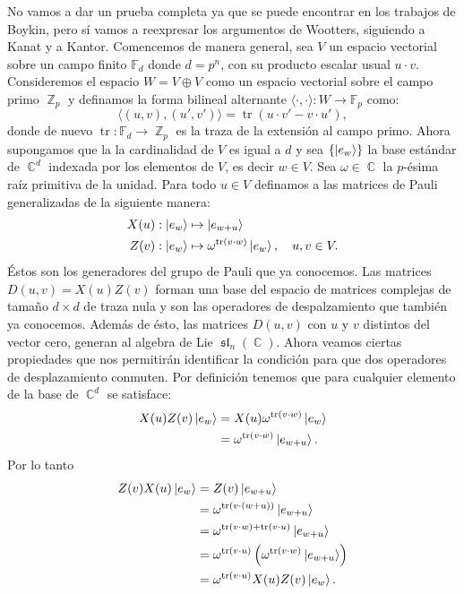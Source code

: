 \documentclass[a4paper]{report}
\DeclareMathOperator{\C}{\mathbb{C}}
\DeclareMathOperator{\Z}{\mathbb{Z}}
\DeclareMathOperator{\tr}{tr}
\DeclareMathOperator{\Sl}{\mathfrak{sl}}
\begin{document}
  No vamos a dar un prueba completa ya que se puede
  encontrar en los trabajos de Boykin, pero sí vamos a
  reexpresar los argumentos de Wootters, siguiendo a Kanat y
  a Kantor. Comencemos de manera general, sea $V$ un espacio
  vectorial sobre un campo finito $\mathbb F_d$ donde $d =
  p^{n}$, con su producto escalar usual $u \cdot v$.
  Consideremos el espacio $W = V \oplus V$ como un espacio
  vectorial sobre el campo primo $\Z_p$ y definamos la forma
  bilineal alternante $\langle \cdot, \cdot \rangle : W \to
  \mathbb F_p$ como:
  \begin{equation}
    \label{eqn:bilinear_form}
    \langle (u,v), (u',v') \rangle
    = \tr\left( u \cdot v' - v \cdot u' \right),
  \end{equation}
  donde de nuevo $\tr : \mathbb F_d \to \Z_p$ es la traza de
  la extensión al campo primo. Ahora supongamos que la la
  cardinalidad de $V$ es igual a $d$ y sea $\{\ket{e_w}\}$
  la base estándar de $\C^{d}$ indexada por los elementos de
  $V$, es decir $w \in V$. Sea $\omega \in \C$ la $p$-ésima
  raíz primitiva de la unidad. Para todo $u \in V$ definamos
  a las matrices de Pauli generalizadas de la siguiente
  manera:
  \begin{align}
    X(u) &: \ket{e_w} \mapsto \ket{e_{w+u}} \\
    Z(v) &: \ket{e_w} \mapsto \omega^{\tr(v \cdot w)}
    \ket{e_w},
    \quad
    u, v \in V.
  \end{align}
  Éstos son los generadores del grupo de Pauli que ya
  conocemos. Las matrices $D(u,v) = X(u)Z(v)$ forman una
  base del espacio de matrices complejas de tamaño $d \times
  d$ de traza nula y son las operadores de despalzamiento
  que también ya conocemos.  Además de ésto, las matrices
  $D(u,v)$ con $u$ y $v$ distintos del vector cero, generan
  al algebra de Lie $\Sl_n(\C)$. Ahora veamos ciertas
  propiedades que nos permitirán identificar la condición
  para que dos operadores de desplazamiento conmuten. Por
  definición tenemos que para cualquier elemento de la base
  de $\C^{d}$ se satisface:
  \begin{align}
    X(u)Z(v) \ket{e_w}
    &= X(u) \omega^{\tr(v \cdot w)} \ket{e_w} \\
    &= \omega^{\tr(v \cdot w)} \ket{e_{w+u}}.
  \end{align}
  Por lo tanto
  \begin{align}
    Z(v)X(u) \ket{e_w}
    &= Z(v) \ket{e_{w+u}} \\
    &= \omega^{\tr(v \cdot (w+u))} \ket{e_{w+u}} \\
    &= \omega^{\tr(v \cdot w) + \tr(v \cdot u)}
    \ket{e_{w+u}} \\
    &= \omega^{\tr(v \cdot u)} \left( \omega^{\tr(v \cdot
    w)} \ket{e_{w+u}} \right) \\
    &= \omega^{\tr(v \cdot u)} X(u)Z(v) \ket{e_{w}}.
  \end{align}
\end{document}
